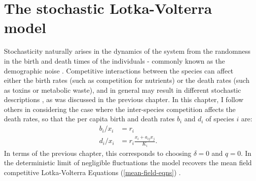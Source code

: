 

\section{The stochastic Lotka-Volterra model}
Stochasticity naturally arises in the dynamics of the system from the randomness in the birth and death times of the individuals - commonly known as the demographic noise \cite{VanKampen1992,Elgart2004a,Parker2009,Assaf2006}. 
Competitive interactions between the species can affect either the birth rates (such as competition for nutrients) or the death rates (such as toxins or metabolic waste), and in general may result in different stochastic descriptions \cite{Allen2003a,Badali2018}, as was discussed in the previous chapter. 
In this chapter, I follow others \cite{Lin2012,Gabel2013,Constable2015} in considering the case where the inter-species competition affects the death rates, so that the per capita birth and death rates $b_i$ and $d_i$ of species $i$ are:
\begin{equation}
\begin{aligned}
b_i/x_i &= r_i \\
d_i/x_i &= r_i\frac{x_i+a_{ij}x_j}{K_i}.  \label{deathrate}
\end{aligned}
\end{equation}
In terms of the previous chapter, this corresponds to choosing $\delta = 0$ and $q=0$. %
In the deterministic limit of negligible fluctuations the model recovers the mean field competitive Lotka-Volterra Equations (\ref{mean-field-eqns}) \cite{Lin2012}. 

